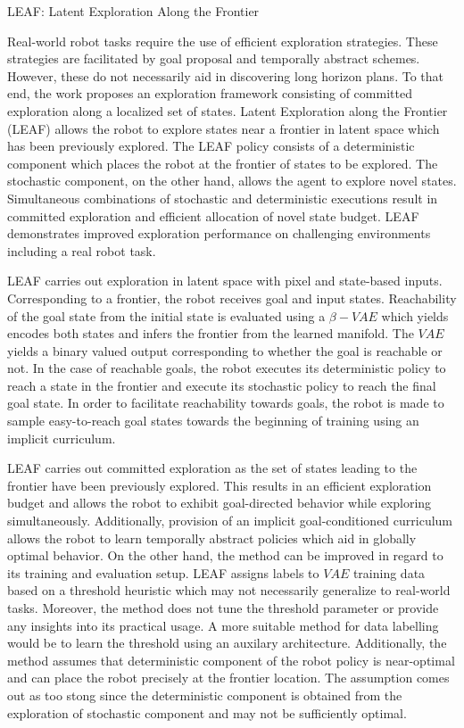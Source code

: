\documentclass[11pt,letterpaper]{article}
\begin{document}
\begin{center}
  \large{LEAF: Latent Exploration Along the Frontier}
\end{center}
Real-world robot tasks require the use of efficient exploration strategies. These strategies are facilitated by goal proposal and temporally abstract schemes. However, these do not necessarily aid in discovering long horizon plans. To that end, the work proposes an exploration framework consisting of committed exploration along a localized set of states. Latent Exploration along the Frontier (LEAF) allows the robot to explore states near a frontier in latent space which has been previously explored. The LEAF policy consists of a deterministic component which places the robot at the frontier of states to be explored. The stochastic component, on the other hand, allows the agent to explore novel states. Simultaneous combinations of stochastic and deterministic executions result in committed exploration and efficient allocation of novel state budget. LEAF demonstrates improved exploration performance on challenging environments including a real robot task. 

LEAF carries out exploration in latent space with pixel and state-based inputs. Corresponding to a frontier, the robot receives goal and input states. Reachability of the goal state from the initial state is evaluated using a $\beta-VAE$ which yields encodes both states and infers the frontier from the learned manifold. The $VAE$ yields a binary valued output corresponding to whether the goal is reachable or not. In the case of reachable goals, the robot executes its deterministic policy to reach a state in the frontier and execute its stochastic policy to reach the final goal state. In order to facilitate reachability towards goals, the robot is made to sample easy-to-reach goal states towards the beginning of training using an implicit curriculum.

LEAF carries out committed exploration as the set of states leading to the frontier have been previously explored. This results in an efficient exploration budget and allows the robot to exhibit goal-directed behavior while exploring simultaneously. Additionally, provision of an implicit goal-conditioned curriculum allows the robot to learn temporally abstract policies which aid in globally optimal behavior. On the other hand, the method can be improved in regard to its training and evaluation setup. LEAF assigns labels to $VAE$ training data based on a threshold heuristic which may not necessarily generalize to real-world tasks. Moreover, the method does not tune the threshold parameter or provide any insights into its practical usage. A more suitable method for data labelling would be to learn the threshold using an auxilary architecture. Additionally, the method assumes that deterministic component of the robot policy is near-optimal and can place the robot precisely at the frontier location. The assumption comes out as too stong since the deterministic component is obtained from the exploration of stochastic component and may not be sufficiently optimal. 
\end{document}
